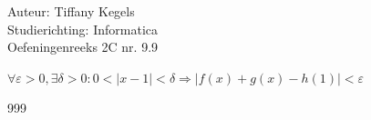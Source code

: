 \documentclass[a4paper]{article}
\begin{document}
  
\noindent \large Auteur: Tiffany Kegels \\
\noindent \large Studierichting: Informatica\\
\noindent \large Oefeningenreeks 2C nr. 9.9\\

\medskip

\normalsize

$\forall \varepsilon > 0, \exists \delta> 0 : 0 < |x-1| < \delta \Rightarrow |f(x) + g(x) -h(1)| < \varepsilon$\\


\begin{thebibliography}{999}

\end{thebibliography}
\end{document}
